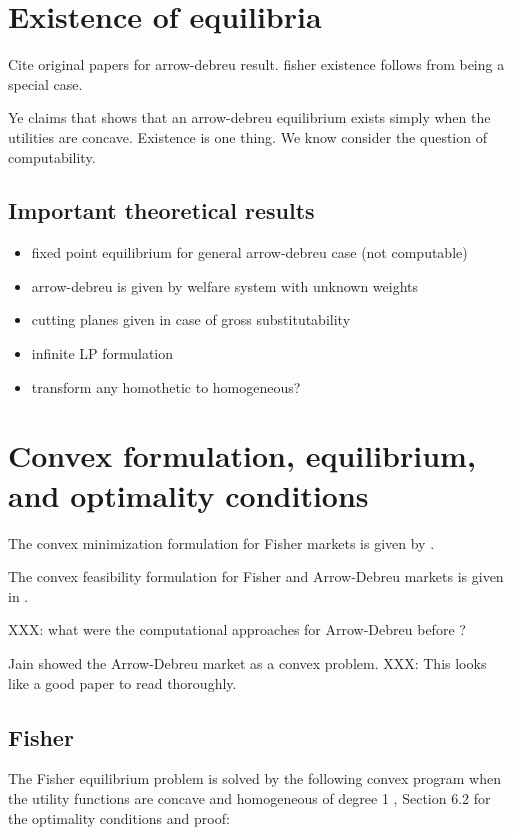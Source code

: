 \documentclass{article}
\begin{document}
\section{Existence of equilibria}
Cite original papers for arrow-debreu result.
fisher existence follows from being a special case.

Ye claims that \cite{arrow1954existence} shows that an arrow-debreu equilibrium exists simply when the utilities are concave.
Existence is one thing. We know consider the question of computability.

\subsection{Important theoretical results}
\begin{itemize}
\item fixed point equilibrium for general arrow-debreu case (not computable)
\item arrow-debreu is given by welfare system with unknown weights
\item cutting planes given in case of gross substitutability
\item infinite LP formulation
\item transform any homothetic to homogeneous?
\end{itemize}


\section{Convex formulation, equilibrium, and optimality conditions}
The convex minimization formulation for Fisher markets is given by \cite{eisenberg1961aggregation}.

The convex feasibility formulation for Fisher and Arrow-Debreu markets is given in \cite{chen2010equilibrium}.

XXX: what were the computational approaches for Arrow-Debreu before \cite{chen2010equilibrium}?

Jain \cite{jain2007polynomial} showed the Arrow-Debreu market as a convex problem.
XXX: This looks like a good paper to read thoroughly. 

\subsection{Fisher}

The Fisher equilibrium problem is solved by the following convex program when the utility functions are concave and homogeneous of degree 1 \cite{nisan2007algorithmic}, Section 6.2 for the optimality conditions and proof:
\end{document}
